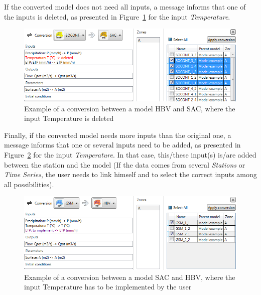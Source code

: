 \documentclass[
  letterpaper,
  DIV=11,
  numbers=noendperiod]{scrreprt}
\begin{document}
If the converted model does not need all inputs, a message informs that
one of the inputs is deleted, as presented in
Figure~\ref{fig-example_conversion_hbv_sac} for the input
\emph{Temperature}.

\begin{figure}

{\centering \includegraphics{./figures/fig-example_conversion_hbv_sac.png}

}

\caption{\label{fig-example_conversion_hbv_sac}Example of a conversion
between a model HBV and SAC, where the input Temperature is deleted}

\end{figure}

Finally, if the converted model needs more inputs than the original one,
a message informs that one or several inputs need to be added, as
presented in Figure~\ref{fig-example_conversion_sac_hbv} for the input
\emph{Temperature}. In that case, this/these input(s) is/are added
between the station and the model (If the data comes from several
\emph{Stations} or \emph{Time Series}, the user needs to link himself
and to select the correct inputs among all possibilities).

\begin{figure}

{\centering \includegraphics{./figures/fig-example_conversion_sac_hbv.png}

}

\caption{\label{fig-example_conversion_sac_hbv}Example of a conversion
between a model SAC and HBV, where the input Temperature has to be
implemented by the user}

\end{figure}
\end{document}
